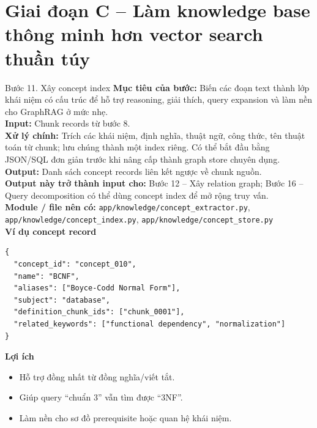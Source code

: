 \documentclass[12pt,a4paper]{article}
\newcommand{\stepgoal}[1]{\textbf{Mục tiêu của bước:} #1\\}
\newcommand{\stepinput}[1]{\textbf{Input:} #1\\}
\newcommand{\stepprocess}[1]{\textbf{Xử lý chính:} #1\\}
\newcommand{\stepoutput}[1]{\textbf{Output:} #1\\}
\newcommand{\stepnext}[1]{\textbf{Output này trở thành input cho:} #1\\}
\newcommand{\stepmodules}[1]{\textbf{Module / file nên có:} #1\\}
\begin{document}
\section{Giai đoạn C -- Làm knowledge base thông minh hơn vector search thuần túy}

\begin{stepbox}{Bước 11. Xây concept index}
\stepgoal{Biến các đoạn text thành lớp khái niệm có cấu trúc để hỗ trợ reasoning, giải thích, query expansion và làm nền cho GraphRAG ở mức nhẹ.}
\stepinput{Chunk records từ bước 8.}
\stepprocess{Trích các khái niệm, định nghĩa, thuật ngữ, công thức, tên thuật toán từ chunk; lưu chúng thành một index riêng. Có thể bắt đầu bằng JSON/SQL đơn giản trước khi nâng cấp thành graph store chuyên dụng.}
\stepoutput{Danh sách concept records liên kết ngược về chunk nguồn.}
\stepnext{Bước 12 -- Xây relation graph; Bước 16 -- Query decomposition có thể dùng concept index để mở rộng truy vấn.}
\stepmodules{\texttt{app/knowledge/concept\_extractor.py}, \texttt{app/knowledge/concept\_index.py}, \texttt{app/knowledge/concept\_store.py}}

\textbf{Ví dụ concept record}
\begin{lstlisting}
{
  "concept_id": "concept_010",
  "name": "BCNF",
  "aliases": ["Boyce-Codd Normal Form"],
  "subject": "database",
  "definition_chunk_ids": ["chunk_0001"],
  "related_keywords": ["functional dependency", "normalization"]
}
\end{lstlisting}

\textbf{Lợi ích}
\begin{itemize}
    \item Hỗ trợ đồng nhất từ đồng nghĩa/viết tắt.
    \item Giúp query ``chuẩn 3'' vẫn tìm được ``3NF''.
    \item Làm nền cho sơ đồ prerequisite hoặc quan hệ khái niệm.
\end{itemize}
\end{stepbox}
\end{document}
